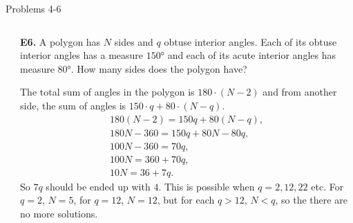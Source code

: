 \documentclass[9pt,aspectratio=169,handout]{beamer}
\begin{document}
\begin{frame}{Problems 4-6}
\begin{columns}[T]
\begin{column}{0.5\textwidth}
    \end{column}
    \begin{column}{0.5\textwidth}
      \begin{problem}
        \textbf{E6.} A polygon has $N$ sides and $q$ obtuse interior angles. Each of its obtuse interior angles has a measure $150°$ and each of its acute interior angles has measure $80°$. How many sides does the polygon have?
      \end{problem}\pause
      The total sum of angles in the polygon is $180 \cdot (N - 2)$ and from another side, the sum of angles is $150 \cdot q + 80 \cdot (N - q)$.
      \begin{gather*}
        180 (N - 2) = 150 q + 80 (N - q),\\
        180 N - 360 = 150 q + 80 N - 80 q,\\
        100 N - 360 = 70 q, \\
        100 N = 360 + 70 q, \\
        10 N = 36 + 7q.
      \end{gather*}\pause
      So $7q$ should be ended up with $4$. This is possible when $q = 2, 12, 22$ etc. For $q = 2$, $\boxed{N = 5}$, for $q = 12$, $\boxed{N = 12}$, but for each $q> 12$, $N < q$, so the there are no more solutions. 
    \end{column}
  \end{columns}
\end{frame}
\end{document}
